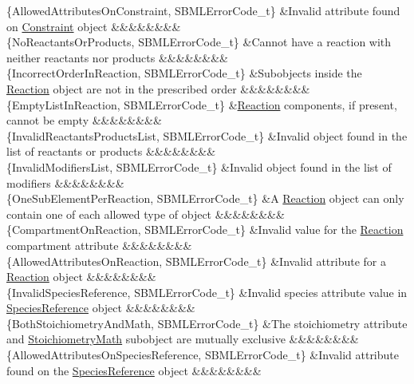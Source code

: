\begin{DoxyParagraph}{}
\begin{longtabu}
\{Allowed\+Attributes\+On\+Constraint, S\+B\+M\+L\+Error\+Code\+\_\+t\} &Invalid attribute found on \hyperlink{class_constraint}{Constraint} object &&&&&&&&\\
\{No\+Reactants\+Or\+Products, S\+B\+M\+L\+Error\+Code\+\_\+t\} &Cannot have a reaction with neither reactants nor products &&&&&&&&\\
\{Incorrect\+Order\+In\+Reaction, S\+B\+M\+L\+Error\+Code\+\_\+t\} &Subobjects inside the \hyperlink{class_reaction}{Reaction} object are not in the prescribed order &&&&&&&&\\
\{Empty\+List\+In\+Reaction, S\+B\+M\+L\+Error\+Code\+\_\+t\} &\hyperlink{class_reaction}{Reaction} components, if present, cannot be empty &&&&&&&&\\
\{Invalid\+Reactants\+Products\+List, S\+B\+M\+L\+Error\+Code\+\_\+t\} &Invalid object found in the list of reactants or products &&&&&&&&\\
\{Invalid\+Modifiers\+List, S\+B\+M\+L\+Error\+Code\+\_\+t\} &Invalid object found in the list of modifiers &&&&&&&&\\
\{One\+Sub\+Element\+Per\+Reaction, S\+B\+M\+L\+Error\+Code\+\_\+t\} &A \hyperlink{class_reaction}{Reaction} object can only contain one of each allowed type of object &&&&&&&&\\
\{Compartment\+On\+Reaction, S\+B\+M\+L\+Error\+Code\+\_\+t\} &Invalid value for the \hyperlink{class_reaction}{Reaction} \textquotesingle{}compartment\textquotesingle{} attribute &&&&&&&&\\
\{Allowed\+Attributes\+On\+Reaction, S\+B\+M\+L\+Error\+Code\+\_\+t\} &Invalid attribute for a \hyperlink{class_reaction}{Reaction} object &&&&&&&&\\
\{Invalid\+Species\+Reference, S\+B\+M\+L\+Error\+Code\+\_\+t\} &Invalid \textquotesingle{}species\textquotesingle{} attribute value in \hyperlink{class_species_reference}{Species\+Reference} object &&&&&&&&\\
\{Both\+Stoichiometry\+And\+Math, S\+B\+M\+L\+Error\+Code\+\_\+t\} &The \textquotesingle{}stoichiometry\textquotesingle{} attribute and \hyperlink{class_stoichiometry_math}{Stoichiometry\+Math} subobject are mutually exclusive &&&&&&&&\\
\{Allowed\+Attributes\+On\+Species\+Reference, S\+B\+M\+L\+Error\+Code\+\_\+t\} &Invalid attribute found on the \hyperlink{class_species_reference}{Species\+Reference} object &&&&&&&&\\

\end{longtabu}
\end{DoxyParagraph}
